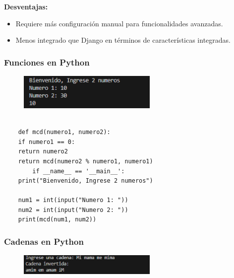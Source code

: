 \documentclass[12pt, a4paper]{article}
\begin{document}
	\textbf{Desventajas:}
	\begin{itemize}
		\item Requiere más configuración manual para funcionalidades avanzadas.
		\item Menos integrado que Django en términos de características integradas.
	\end{itemize}
	
	\vspace{0.5cm}
	
\subsubsection*{Funciones en Python}

\begin{figure}[ht]
	\centering
	\includegraphics[width=0.6\textwidth]{images/funciones_python.png}
	\label{fig:funciones_python}
\end{figure}

\begin{verbatim}

	def mcd(numero1, numero2):
	if numero1 == 0:
	return numero2
	return mcd(numero2 % numero1, numero1)
		if __name__ == '__main__':
	print("Bienvenido, Ingrese 2 numeros")
	
	num1 = int(input("Numero 1: "))
	num2 = int(input("Numero 2: "))
	print(mcd(num1, num2))
\end{verbatim}

\vspace{0.5cm}

\subsubsection*{Cadenas en Python}

\begin{figure}[ht]
	\centering
	\includegraphics[width=0.6\textwidth]{images/cadenas_python.png}
	\label{fig:cadenas_python}
\end{figure}
\end{document}
